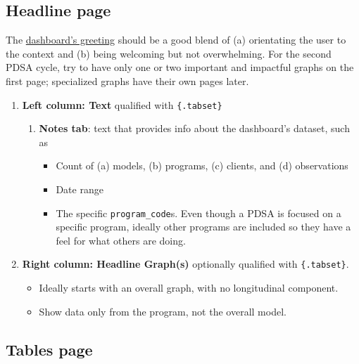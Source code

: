 \documentclass[
]{book}
\providecommand{\tightlist}{%
  \setlength{\itemsep}{0pt}\setlength{\parskip}{0pt}}
\begin{document}
\hypertarget{headline-page}{%
\subsection{Headline page}\label{headline-page}}

The \href{https://ouhscbbmc.github.io/data-science-practices-1/dashboard-1.html\#summary}{dashboard's greeting} should be a good blend of (a) orientating the user to the context and (b) being welcoming but not overwhelming. For the second PDSA cycle, try to have only one or two important and impactful graphs on the first page; specialized graphs have their own pages later.

\begin{enumerate}
\def\labelenumi{\arabic{enumi}.}
\tightlist
\item
  \textbf{Left column: Text} qualified with \texttt{\{.tabset\}}

  \begin{enumerate}
  \def\labelenumii{\arabic{enumii}.}
  \tightlist
  \item
    \textbf{Notes tab}: text that provides info about the dashboard's dataset, such as

    \begin{itemize}
    \tightlist
    \item
      Count of (a) models, (b) programs, (c) clients, and (d) observations
    \item
      Date range
    \item
      The specific \texttt{program\_code}s. Even though a PDSA is focused on a specific program, ideally other programs are included so they have a feel for what others are doing.
    \end{itemize}
  \end{enumerate}
\item
  \textbf{Right column: Headline Graph(s)} optionally qualified with \texttt{\{.tabset\}}.

  \begin{itemize}
  \tightlist
  \item
    Ideally starts with an overall graph, with no longitudinal component.
  \item
    Show data only from the program, not the overall model.
  \end{itemize}
\end{enumerate}

\hypertarget{tables-page}{%
\subsection{Tables page}\label{tables-page}}
\end{document}
